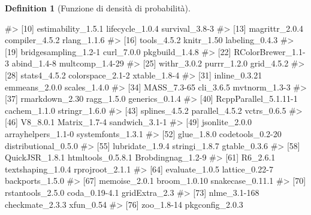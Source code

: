 \documentclass[
  letterpaper,
  DIV=11,
  numbers=noendperiod,
  oneside]{scrreprt}
\newenvironment{Shaded}{\begin{snugshade}}{\end{snugshade}}
\newcommand{\CommentTok}[1]{\textcolor[rgb]{0.37,0.37,0.37}{#1}}
\theoremstyle{definition}
\theoremstyle{plain}
\theoremstyle{definition}
\newtheorem{definition}{Definition}[chapter]
\theoremstyle{remark}
\begin{document}
\begin{definition}[Funzione di densità di
probabilità]
\begin{tcolorbox}
\begin{Shaded}
\begin{Highlighting}[]
\CommentTok{\#\textgreater{} [10] estimability\_1.5.1    lifecycle\_1.0.4       survival\_3.8{-}3       }
\CommentTok{\#\textgreater{} [13] magrittr\_2.0.4        compiler\_4.5.2        rlang\_1.1.6          }
\CommentTok{\#\textgreater{} [16] tools\_4.5.2           knitr\_1.50            labeling\_0.4.3       }
\CommentTok{\#\textgreater{} [19] bridgesampling\_1.2{-}1  curl\_7.0.0            pkgbuild\_1.4.8       }
\CommentTok{\#\textgreater{} [22] RColorBrewer\_1.1{-}3    abind\_1.4{-}8           multcomp\_1.4{-}29      }
\CommentTok{\#\textgreater{} [25] withr\_3.0.2           purrr\_1.2.0           grid\_4.5.2           }
\CommentTok{\#\textgreater{} [28] stats4\_4.5.2          colorspace\_2.1{-}2      xtable\_1.8{-}4         }
\CommentTok{\#\textgreater{} [31] inline\_0.3.21         emmeans\_2.0.0         scales\_1.4.0         }
\CommentTok{\#\textgreater{} [34] MASS\_7.3{-}65           cli\_3.6.5             mvtnorm\_1.3{-}3        }
\CommentTok{\#\textgreater{} [37] rmarkdown\_2.30        ragg\_1.5.0            generics\_0.1.4       }
\CommentTok{\#\textgreater{} [40] RcppParallel\_5.1.11{-}1 cachem\_1.1.0          stringr\_1.6.0        }
\CommentTok{\#\textgreater{} [43] splines\_4.5.2         parallel\_4.5.2        vctrs\_0.6.5          }
\CommentTok{\#\textgreater{} [46] V8\_8.0.1              Matrix\_1.7{-}4          sandwich\_3.1{-}1       }
\CommentTok{\#\textgreater{} [49] jsonlite\_2.0.0        arrayhelpers\_1.1{-}0    systemfonts\_1.3.1    }
\CommentTok{\#\textgreater{} [52] glue\_1.8.0            codetools\_0.2{-}20      distributional\_0.5.0 }
\CommentTok{\#\textgreater{} [55] lubridate\_1.9.4       stringi\_1.8.7         gtable\_0.3.6         }
\CommentTok{\#\textgreater{} [58] QuickJSR\_1.8.1        htmltools\_0.5.8.1     Brobdingnag\_1.2{-}9    }
\CommentTok{\#\textgreater{} [61] R6\_2.6.1              textshaping\_1.0.4     rprojroot\_2.1.1      }
\CommentTok{\#\textgreater{} [64] evaluate\_1.0.5        lattice\_0.22{-}7        backports\_1.5.0      }
\CommentTok{\#\textgreater{} [67] memoise\_2.0.1         broom\_1.0.10          snakecase\_0.11.1     }
\CommentTok{\#\textgreater{} [70] rstantools\_2.5.0      coda\_0.19{-}4.1         gridExtra\_2.3        }
\CommentTok{\#\textgreater{} [73] nlme\_3.1{-}168          checkmate\_2.3.3       xfun\_0.54            }
\CommentTok{\#\textgreater{} [76] zoo\_1.8{-}14            pkgconfig\_2.0.3}
\end{Highlighting}
\end{Shaded}

\end{tcolorbox}


\end{definition}
\end{document}
